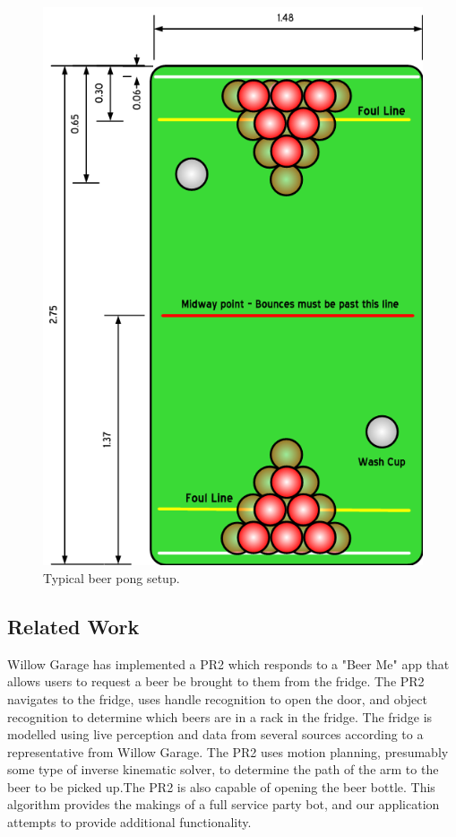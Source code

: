 \documentclass[letterpaper, 10 pt, conference]{ieeeconf}  %
\begin{document}
\begin{figure}[thpb]
      \centering
	  \includegraphics[scale =0.25]{pongtable}
      \caption{Typical beer pong setup.}
      \label{fig:pongtable}
\end{figure}

\subsection{Related Work}

Willow Garage has implemented a PR2 which responds to a "Beer Me" app that allows users to request a beer be brought to them from the fridge. The PR2 navigates to the fridge, uses handle recognition to open the door, and object recognition to determine which beers are in a rack in the fridge. The fridge is modelled using live perception and data from several sources according to a representative from Willow Garage. The PR2  uses motion planning, presumably some type of inverse kinematic solver, to determine the path of the arm to the beer to be picked up.The PR2 is also capable of opening the beer bottle. This algorithm provides the makings of a full service party bot, and our application attempts to provide additional functionality.  
\end{document}
